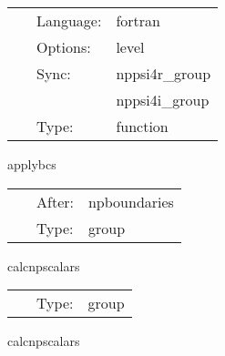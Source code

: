 \hspace{5mm}{\it symmetry boundary conditions } 


\hspace{5mm}

 \begin{tabular*}{160mm}{cll} 
~ & Language:  & fortran \\ 
~ & Options:  & level \\ 
~ & Sync:  & nppsi4r\_group \\ 
~& ~ &nppsi4i\_group\\ 
~ & Type:  & function \\ 
\end{tabular*} 


\vspace{5mm}


\hspace{5mm} applybcs 

\hspace{5mm}{\it apply boundary conditions } 


\hspace{5mm}

 \begin{tabular*}{160mm}{cll} 
~ & After:  & npboundaries \\ 
~ & Type:  & group \\ 
\end{tabular*} 


\vspace{5mm}


\hspace{5mm} calcnpscalars 

\hspace{5mm}{\it calculate npscalars } 


\hspace{5mm}

 \begin{tabular*}{160mm}{cll} 
~ & Type:  & group \\ 
\end{tabular*} 


\vspace{5mm}


\hspace{5mm} calcnpscalars 

\hspace{5mm}{\it calculate npscalars } 


